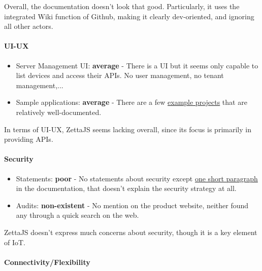 \documentclass{article}
\begin{document}
Overall, the documentation doesn't look that good. Particularly, it uses the integrated Wiki function of Github, making it clearly dev-oriented, and ignoring all other actors.

\paragraph{UI-UX}

\begin{itemize}
\item Server Management UI: \textbf{average} - There is a UI but it seems only capable to list devices and access their APIs. No user management, no tenant management,...
\item Sample applications: \textbf{average} - There are a few \href{http://www.zettajs.org/projects/}{example projects} that are relatively well-documented.
\end{itemize}

In terms of UI-UX, ZettaJS seems lacking overall, since its focus is primarily in providing APIs.

\paragraph{Security} 

\begin{itemize}
\item Statements: \textbf{poor} - No statements about security except \href{https://github.com/zettajs/zetta/wiki/Overview#linking}{one short paragraph} in the documentation, that doesn't explain the security strategy at all.
\item Audits: \textbf{non-existent} - No mention on the product website, neither found any through a quick search on the web.
\end{itemize}

ZettaJS doesn't express much concerns about security, though it is a key element of IoT.

\paragraph{Connectivity/Flexibility}
\end{document}
